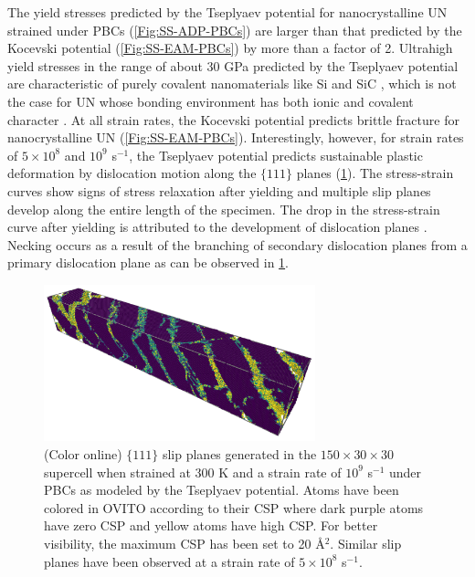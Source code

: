\documentclass[applsci,article,submit,pdftex,moreauthors]{Definitions/mdpi}
\newcommand{\?}{\stackrel{?}{=}}
\begin{document}
The yield stresses predicted by the Tseplyaev potential for nanocrystalline UN strained under PBCs (\cref{Fig:SS-ADP-PBCs}) are larger than that predicted by the Kocevski potential (\cref{Fig:SS-EAM-PBCs}) by more than a factor of 2. Ultrahigh yield stresses in the range of about 30 GPa predicted by the Tseplyaev potential are characteristic of purely covalent nanomaterials like Si and SiC \cite{Ivashchenko2007}, which is not the case for UN whose bonding environment has both ionic and covalent character \cite{Kuksin2016}. At all strain rates, the Kocevski potential predicts brittle fracture for nanocrystalline UN (\cref{Fig:SS-EAM-PBCs}). Interestingly, however, for strain rates of $5 \times 10^{8}$ and $10^{9}$ s$^{-1}$, the Tseplyaev potential predicts sustainable plastic deformation by dislocation motion along the $\{ 111 \}$ planes (\cref{Fig:Slip}). The stress-strain curves show signs of stress relaxation after yielding and multiple slip planes develop along the entire length of the specimen. The drop in the stress-strain curve after yielding is attributed to the development of dislocation planes \cite{Pal2020}. Necking occurs as a result of the branching of secondary dislocation planes from a primary dislocation plane \cite{Pal2020} as can be observed in \cref{Fig:Slip}.

\begin{figure}[h!]
    \centering
    \includegraphics[width=0.70\textwidth]{SlipADP1e9.png}
    \caption{(Color online) $\{ 111 \}$ slip planes generated in the $150 \times 30 \times 30$ supercell when strained at 300 K and a strain rate of $10^{9}$ s$^{-1}$ under PBCs as modeled by the Tseplyaev potential. Atoms have been colored in OVITO according to their CSP where dark purple atoms have zero CSP and yellow atoms have high CSP. For better visibility, the maximum CSP has been set to 20 \AA$^2$. Similar slip planes have been observed at a strain rate of $5 \times 10^{8}$ s$^{-1}$.}
    \label{Fig:Slip}
\end{figure}
\end{document}
